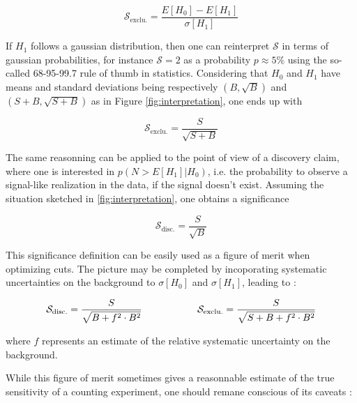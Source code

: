     $$ \mathcal{S}_\text{exclu.} = \frac{E[H_0] - E[H_1]}{\sigma[H_1]}$$

    If $H_1$ follows a gaussian distribution, then one can reinterpret $\mathcal{S}$ in terms
    of gaussian probabilities, for instance $\mathcal{S} = 2$ as a probability $p\approx5\%$ 
    using the so-called 68-95-99.7 rule of thumb in statistics. Considering that $H_0$ and 
    $H_1$ have means and standard deviations being respectively $(B,\sqrt{B})$ and 
    $(S+B,\sqrt{S+B})$ as in Figure \ref{fig:interpretation}, one ends up with 

    $$ \mathcal{S}_\text{exclu.} = \frac{S}{\sqrt{S+B}}$$

    The same reasonning can be applied to the point of view of a discovery claim, where
    one is interested in $p(N > E[H_1]|H_0)$, i.e. the probability to observe a 
    signal-like realization in the data, if the signal doesn't exist. Assuming the situation
    sketched in \ref{fig:interpretation}, one obtains a significance

    $$ \mathcal{S}_\text{disc.} = \frac{S}{\sqrt{B}}$$

    This significance definition can be easily used as a figure of merit when optimizing
    cuts. The picture may be completed by incoporating systematic uncertainties on the
    background to $\sigma[H_0]$ and $\sigma[H_1]$, leading to :
    
    \begin{equation}
       \mathcal{S}_\text{disc.} = \frac{S}{\sqrt{B+f^2 \cdot B^2}}
       \hspace*{2cm} 
       \mathcal{S}_\text{exclu.} = \frac{S}{\sqrt{S+B+f^2 \cdot B^2}}
       \label{FoM}
   \end{equation}

    where $f$ represents an estimate of the relative systematic uncertainty on the background.
    
    While this figure of merit sometimes gives a reasonnable estimate of the true 
    sensitivity of a counting experiment, one should remane conscious of its caveats 
    \cite{Punzi} :

